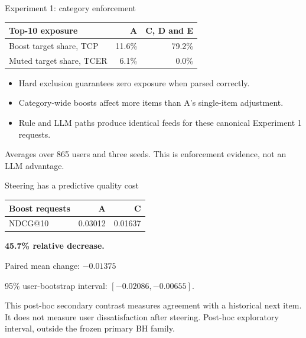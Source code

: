 \documentclass[10pt]{beamer}
\newcommand{\toprule}{\hline}
\newcommand{\midrule}{\hline}
\newcommand{\bottomrule}{\hline}
\newcommand{\src}[1]{\vfill{\tiny\color{bcitgray}#1}}
\begin{document}
\begin{frame}{Experiment 1: category enforcement}
\begin{tabular}{@{}lrr@{}}
\toprule
Top-10 exposure & A & C, D and E\\\midrule
Boost target share, TCP & 11.6\% & 79.2\%\\[0.15cm]
Muted target share, TCER & 6.1\% & 0.0\%\\\bottomrule
\end{tabular}\par
\vspace{0.4cm}
\begin{itemize}
\item Hard exclusion guarantees zero exposure when parsed correctly.
\item Category-wide boosts affect more items than A's single-item adjustment.
\item Rule and LLM paths produce identical feeds for these canonical Experiment 1 requests.
\end{itemize}
\src{Averages over 865 users and three seeds. This is enforcement evidence, not an LLM advantage.}
\end{frame}

\begin{frame}{Steering has a predictive quality cost}
\begin{tabular}{@{}lrr@{}}
\toprule
Boost requests & A & C\\\midrule
NDCG@10 & 0.03012 & 0.01637\\\bottomrule
\end{tabular}\par
\vspace{0.35cm}
\textbf{45.7\% relative decrease.}
\vspace{0.3cm}

Paired mean change: $-0.01375$\par
95\% user-bootstrap interval: $[-0.02086,-0.00655]$.
\vspace{0.3cm}

This post-hoc secondary contrast measures agreement with a historical next item. It does not measure user dissatisfaction after steering.
\src{Post-hoc exploratory interval, outside the frozen primary BH family.}
\end{frame}
\end{document}
